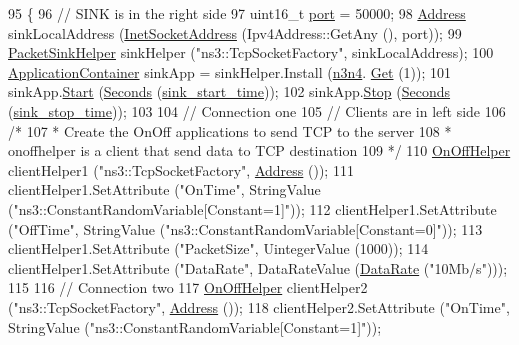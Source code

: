 \begin{DoxyCode}
95 \{
96   \textcolor{comment}{// SINK is in the right side}
97   uint16\_t \hyperlink{dsdv-manet_8cc_a8e0798404bf2cf5dabb84c5ba9a4f236}{port} = 50000;
98   \hyperlink{classns3_1_1Address}{Address} sinkLocalAddress (\hyperlink{classns3_1_1InetSocketAddress}{InetSocketAddress} (Ipv4Address::GetAny (), port));
99   \hyperlink{classns3_1_1PacketSinkHelper}{PacketSinkHelper} sinkHelper (\textcolor{stringliteral}{"ns3::TcpSocketFactory"}, sinkLocalAddress);
100   \hyperlink{classns3_1_1ApplicationContainer}{ApplicationContainer} sinkApp = sinkHelper.Install (\hyperlink{pie-example_8cc_a71269c713841141f40860e991d435588}{n3n4}.
      \hyperlink{classns3_1_1NodeContainer_a9ed96e2ecc22e0f5a3d4842eb9bf90bf}{Get} (1));
101   sinkApp.\hyperlink{classns3_1_1ApplicationContainer_a8eff87926507020bbe3e1390358a54a7}{Start} (\hyperlink{group__timecivil_ga33c34b816f8ff6628e33d5c8e9713b9e}{Seconds} (\hyperlink{pie-example_8cc_a2c56dc9b543a4442a7edd8d680c4a1bc}{sink\_start\_time}));
102   sinkApp.\hyperlink{classns3_1_1ApplicationContainer_adfc52f9aa4020c8714679b00bbb9ddb3}{Stop} (\hyperlink{group__timecivil_ga33c34b816f8ff6628e33d5c8e9713b9e}{Seconds} (\hyperlink{pie-example_8cc_a2462eef540f5b896f14d4ea7b7bb6214}{sink\_stop\_time}));
103 
104   \textcolor{comment}{// Connection one}
105   \textcolor{comment}{// Clients are in left side}
106   \textcolor{comment}{/*}
107 \textcolor{comment}{   * Create the OnOff applications to send TCP to the server}
108 \textcolor{comment}{   * onoffhelper is a client that send data to TCP destination}
109 \textcolor{comment}{  */}
110   \hyperlink{classns3_1_1OnOffHelper}{OnOffHelper} clientHelper1 (\textcolor{stringliteral}{"ns3::TcpSocketFactory"}, \hyperlink{classns3_1_1Address}{Address} ());
111   clientHelper1.SetAttribute (\textcolor{stringliteral}{"OnTime"}, StringValue (\textcolor{stringliteral}{"ns3::ConstantRandomVariable[Constant=1]"}));
112   clientHelper1.SetAttribute (\textcolor{stringliteral}{"OffTime"}, StringValue (\textcolor{stringliteral}{"ns3::ConstantRandomVariable[Constant=0]"}));
113   clientHelper1.SetAttribute (\textcolor{stringliteral}{"PacketSize"}, UintegerValue (1000));
114   clientHelper1.SetAttribute (\textcolor{stringliteral}{"DataRate"}, DataRateValue (\hyperlink{classns3_1_1DataRate}{DataRate} (\textcolor{stringliteral}{"10Mb/s"})));
115 
116   \textcolor{comment}{// Connection two}
117   \hyperlink{classns3_1_1OnOffHelper}{OnOffHelper} clientHelper2 (\textcolor{stringliteral}{"ns3::TcpSocketFactory"}, \hyperlink{classns3_1_1Address}{Address} ());
118   clientHelper2.SetAttribute (\textcolor{stringliteral}{"OnTime"}, StringValue (\textcolor{stringliteral}{"ns3::ConstantRandomVariable[Constant=1]"}));

\end{DoxyCode}
